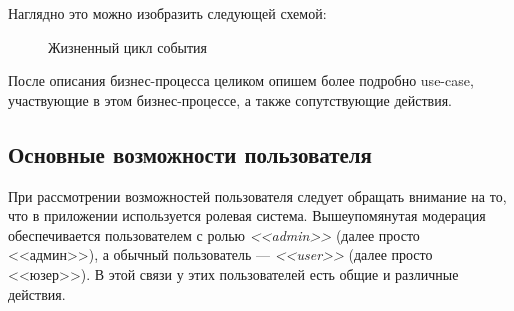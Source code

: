 \documentclass[diploma]{SCWorks}
\begin{document}
Наглядно это можно изобразить следующей схемой:

\begin{figure}[H]
	\caption{Жизненный цикл события}
	\label{pic:event_lifetime}
\end{figure}

После описания бизнес-процесса целиком опишем более подробно use-case, 
участвующие в этом бизнес-процессе, а также сопутствующие действия.

\subsection{Основные возможности пользователя}

При рассмотрении возможностей пользователя следует обращать внимание на то, что
в приложении используется ролевая система. Вышеупомянутая модерация 
обеспечивается пользователем с ролью \textit{<<admin>>} (далее просто 
<<админ>>), а обычный пользователь — \textit{<<user>>} (далее просто <<юзер>>). 
В этой связи у этих пользователей есть общие и различные действия.
\end{document}
